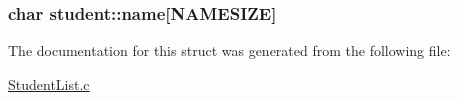 \subsubsection[{\texorpdfstring{name}{name}}]{\setlength{\rightskip}{0pt plus 5cm}char student\+::name\mbox{[}{\bf N\+A\+M\+E\+S\+I\+ZE}\mbox{]}}\hypertarget{structstudent_a4cc31cdf611c0cce37bba9239ea27ae3}{}\label{structstudent_a4cc31cdf611c0cce37bba9239ea27ae3}


The documentation for this struct was generated from the following file\+:\begin{DoxyCompactItemize}
\item 
\hyperlink{StudentList_8c}{Student\+List.\+c}\end{DoxyCompactItemize}

